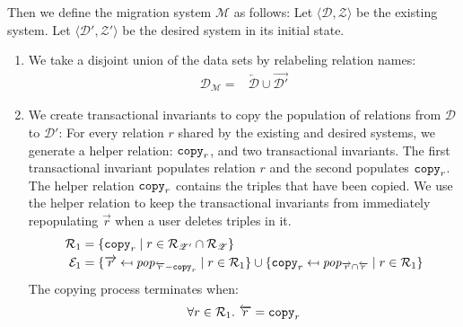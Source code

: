 \documentclass[runningheads]{llncs}
\newcommand{\id}[1]{\text{\it #1\/}}
\newcommand{\popF}[1]{\id{pop}_{#1}}
\newcommand{\pair}[2]{\langle{#1},{#2}\rangle}
\newcommand{\rels}{\mathcal{R}}   %
\newcommand{\transactions}{\mathcal{E}}
\newcommand{\dataset}{\mathscr{D}}
\newcommand{\schema}{\mathscr{Z}}
\newcommand{\migrsys}{\mathscr{M}}
\begin{document}
   Then we define the migration system $\migrsys$ as follows:
   Let $\pair{\dataset}{\schema}$ be the existing system.
   Let $\pair{\dataset'}{\schema'}$ be the desired system in its initial state.
\begin{enumerate}
\item We take a disjoint union of the data sets by relabeling relation names:
   \begin{align}
      \dataset_\migrsys={}&\overleftarrow{\dataset}\cup\overrightarrow{\dataset'}
   \end{align}
\item\label{step2} We create transactional invariants to copy the population of relations from $\dataset$ to $\dataset'$:
   For every relation $r$ shared by the existing and desired systems, we generate a helper relation: ${\tt copy}_r$, and two transactional invariants.
   The first transactional invariant populates relation $r$ and the second populates ${\tt copy}_r$.
   The helper relation ${\tt copy}_r$ contains the triples that have been copied.
   We use the helper relation to keep the transactional invariants from immediately repopulating $\overrightarrow{r}$ when a user deletes triples in it.
   \begin{align}
      \rels_1={}&\{{\tt copy}_r\mid r \in \rels_{\schema'}\cap\rels_{\schema}\}\\
      \transactions_1={}&\{\overrightarrow{r}\mapsfrom \popF{\overleftarrow{r}-{\tt copy}_r} \mid r \in\rels_1\}\cup\{{\tt copy}_r\mapsfrom \popF{\overrightarrow{r}\cap\overleftarrow{r}} \mid r \in\rels_1\}
   \end{align}
   The copying process terminates when:
   \begin{align}
      \forall r\in\rels_1.~\overleftarrow{r}={\tt copy}_r\label{eqn:copyingTerminates}
   \end{align}


\end{enumerate}
\end{document}
